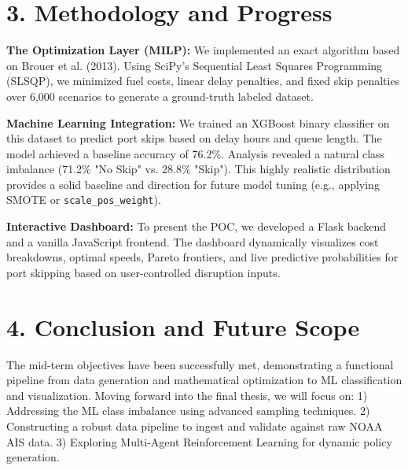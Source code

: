 \documentclass[12pt]{article}
\begin{document}
\section*{3. Methodology and Progress}
\textbf{The Optimization Layer (MILP):} We implemented an exact algorithm based on Brouer et al. (2013). Using SciPy's Sequential Least Squares Programming (SLSQP), we minimized fuel costs, linear delay penalties, and fixed skip penalties over 6,000 scenarios to generate a ground-truth labeled dataset. 

\textbf{Machine Learning Integration:} We trained an XGBoost binary classifier on this dataset to predict port skips based on delay hours and queue length. The model achieved a baseline accuracy of 76.2\%. Analysis revealed a natural class imbalance (71.2\% "No Skip" vs. 28.8\% "Skip"). This highly realistic distribution provides a solid baseline and direction for future model tuning (e.g., applying SMOTE or \texttt{scale\_pos\_weight}).

\textbf{Interactive Dashboard:} To present the POC, we developed a Flask backend and a vanilla JavaScript frontend. The dashboard dynamically visualizes cost breakdowns, optimal speeds, Pareto frontiers, and live predictive probabilities for port skipping based on user-controlled disruption inputs.

\section*{4. Conclusion and Future Scope}
The mid-term objectives have been successfully met, demonstrating a functional pipeline from data generation and mathematical optimization to ML classification and visualization. Moving forward into the final thesis, we will focus on:
1) Addressing the ML class imbalance using advanced sampling techniques.
2) Constructing a robust data pipeline to ingest and validate against raw NOAA AIS data.
3) Exploring Multi-Agent Reinforcement Learning for dynamic policy generation.

\vspace{1cm}
\renewcommand\refname{Bibliography}
\end{document}
